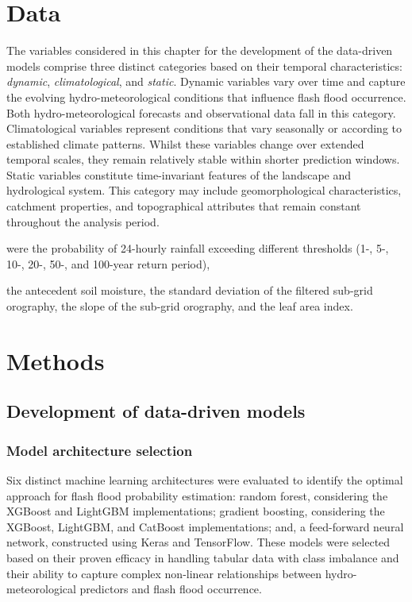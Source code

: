 \section{Data}
\label{data_driven_flash_floods_short_medium_range_data}

The variables considered in this chapter for the development of the data-driven models comprise three distinct categories based on their temporal characteristics: \textit{dynamic}, \textit{climatological}, and \textit{static}. Dynamic variables vary over time and capture the evolving hydro-meteorological conditions that influence flash flood occurrence. Both hydro-meteorological forecasts and observational data fall in this category. Climatological variables represent conditions that vary seasonally or according to established climate patterns. Whilst these variables change over extended temporal scales, they remain relatively stable within shorter prediction windows. Static variables constitute time-invariant features of the landscape and hydrological system. This category may include geomorphological characteristics, catchment properties, and topographical attributes that remain constant throughout the analysis period.


were the probability of 24-hourly rainfall exceeding different thresholds (1-, 5-, 10-, 20-, 50-, and 100-year return period), 



the antecedent soil moisture, the standard deviation of the filtered sub-grid orography, the slope of the sub-grid orography, and the leaf area index. 



\section{Methods}
\label{data_driven_flash_floods_short_medium_range_methods}

\subsection{Development of data-driven models}

\subsubsection{Model architecture selection}
Six distinct machine learning architectures were evaluated to identify the optimal approach for flash flood probability estimation: random forest, considering the XGBoost and LightGBM implementations; gradient boosting, considering the XGBoost, LightGBM, and CatBoost implementations; and, a feed-forward neural network, constructed using Keras and TensorFlow. These models were selected based on their proven efficacy in handling tabular data with class imbalance and their ability to capture complex non-linear relationships between hydro-meteorological predictors and flash flood occurrence.  

